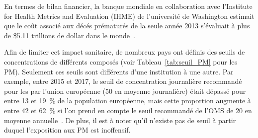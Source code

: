 En termes de bilan financier, la banque mondiale en collaboration avec l'Institute for
Health Metrics and Evaluation (IHME) de l'université de Washington estimait que le coût
associé aux décés prématurés de la seule année 2013 s'évaluait à plus de \$5.11 trillions
de dollar dans le monde~\autocite{worldbankCost2016}.

Afin de limiter cet impact sanitaire, de nombreux pays ont définis des seuils de
concentrations de différents composés (voir Tableau~\ref{tab:seuil_PM} pour les PM).
Seulement ces seuils sont différents d'une institution à une autre. Par exemple, entre
2015 et 2017, le seuil de concentration journalière recommandé pour les \PMdix{} par
l'union européenne (\SI{50}{\ugm} en moyenne journalière) était dépassé pour entre 13 et
19~\% de la population européenne, mais cette proportion augmente à entre 42 et 62~\% si
l'on prend en compte le seuil recommandé de l'OMS de \SI{20}{\ugm} en moyenne
annuelle~\autocite{europeanenvironmentagencyAir2019}.  De plus, il est à noter qu'il
n'existe pas de seuil à partir duquel l'exposition aux PM est inoffensif.

